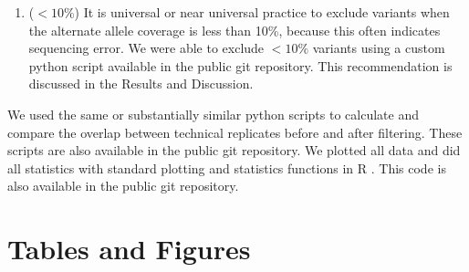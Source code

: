 \documentclass[11pt]{article} %
\begin{document}
\begin{enumerate}
\item ($<10\%$) It is universal or near universal practice to exclude variants when the alternate allele coverage is less than 10\%, because this often indicates sequencing error. We were able to exclude $<10\%$ variants using a custom python script available in the public git repository. This recommendation is discussed in the Results and Discussion.
\end{enumerate}

We used the same or substantially similar python scripts to calculate and compare the overlap between technical replicates before and after filtering. These scripts are also available in the public git repository. We plotted all data and did all statistics with standard plotting and statistics functions in R \citep{Rsoftware}. This code is also available in the public git repository.  





\section*{Tables and Figures}
\end{document}
